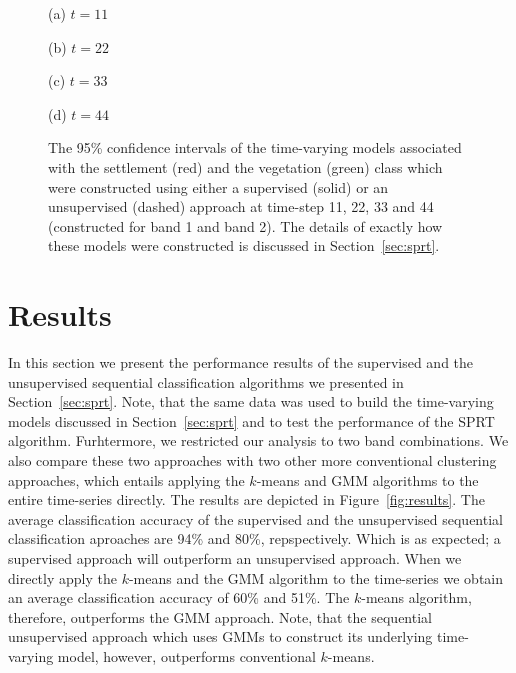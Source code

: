 \documentclass{article}
\begin{document}
\begin{figure}[h!]
\begin{minipage}[b]{.47\linewidth}
  \centering 
  \centerline{}
  \centerline{(a) $t=11$}\medskip
\end{minipage}
\hfill
\begin{minipage}[b]{0.47\linewidth}
  \centering
  \centerline{}
  \centerline{(b) $t=22$}\medskip
\end{minipage}

\begin{minipage}[b]{.47\linewidth}
  \centering 
  \centerline{}
  \centerline{(c) $t=33$}\medskip
\end{minipage}
\hfill
\begin{minipage}[b]{0.47\linewidth}
  \centering
  \centerline{}
  \centerline{(d) $t=44$}\medskip
\end{minipage}
\caption{The 95\% confidence intervals of the time-varying models associated with the settlement (red) and the vegetation (green) class which were constructed using either a supervised (solid) or an unsupervised (dashed) approach at time-step 11, 22, 33 and 44 (constructed 
for band 1 and band 2). The details of exactly how these models were constructed is discussed in Section~\ref{sec:sprt}.}
\label{fig:time_vary_model}
\end{figure}

\section{Results}
In this section we present the performance results of the supervised and the unsupervised sequential classification algorithms we presented in Section~\ref{sec:sprt}.
Note, that the same data was used to build the time-varying models discussed in Section~\ref{sec:sprt} and to test the 
performance of the SPRT algorithm. Furhtermore, we restricted our analysis to two band combinations. We also compare these two approaches with two other more conventional clustering approaches, which entails applying the $k$-means and GMM algorithms to the entire time-series directly.
The results are depicted in Figure~\ref{fig:results}. The average classification accuracy of the supervised and the unsupervised sequential classification aproaches are 94\% and 80\%, repspectively. Which is 
as expected; a supervised approach will outperform an unsupervised approach. When we directly apply the $k$-means and the GMM algorithm to the time-series we obtain 
an average classification accuracy of 60\% and 51\%. The $k$-means algorithm, therefore, outperforms the GMM approach. Note, that the sequential unsupervised approach which uses 
GMMs to construct its underlying time-varying model, however, outperforms conventional $k$-means. 
\end{document}
